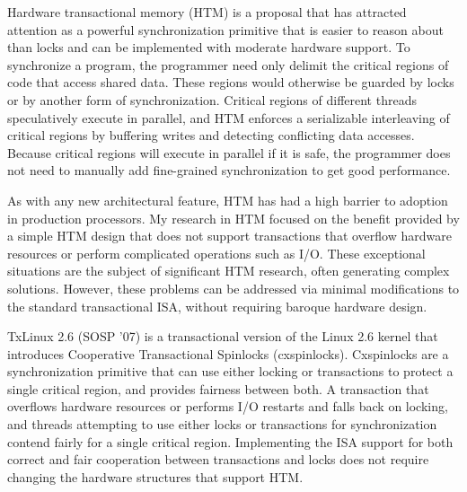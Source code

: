 \documentclass{article}
\begin{document}
Hardware transactional memory (HTM) is a proposal that has attracted
attention as a powerful synchronization primitive that is easier to reason
about than locks and can be implemented with moderate hardware support.
To synchronize a program, the programmer need only delimit the critical
regions of code that access shared data.  These regions would otherwise be
guarded by locks or by another form of synchronization. Critical regions of
different threads speculatively execute in parallel, and HTM enforces a
serializable interleaving of critical regions by buffering writes and
detecting conflicting data accesses.  Because critical regions will execute
in parallel if it is safe, the programmer does not need to manually add
fine-grained synchronization to get good performance.

As with any new architectural feature, HTM has had a high barrier to
adoption in production processors.
My research in HTM focused on the benefit provided by a simple HTM design
that does not support transactions that overflow hardware resources or
perform complicated operations such as I/O. These exceptional situations
are the subject of significant HTM research, often generating complex
solutions.
However, these problems can be addressed via minimal modifications to the
standard transactional ISA, without requiring baroque hardware design.

TxLinux 2.6 (SOSP ’07) is a transactional version of the Linux 2.6 kernel
that introduces Cooperative Transactional Spinlocks (cxspinlocks).
Cxspinlocks are a synchronization primitive that can use either locking or
transactions to protect a single critical region, and provides fairness
between both. A transaction that overflows hardware resources or performs
I/O restarts and falls back on locking, and threads attempting to use
either locks or transactions for synchronization contend fairly for a
single critical region. Implementing the ISA support for both correct and
fair cooperation between transactions and locks does not require changing
the hardware structures that support HTM.
\end{document}

